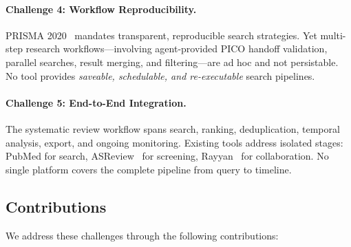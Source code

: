 \documentclass[11pt,a4paper]{article}
\begin{document}
\paragraph{Challenge 4: Workflow Reproducibility.}
PRISMA 2020~\citep{page2021prisma} mandates transparent, reproducible search strategies.
Yet multi-step research workflows---involving agent-provided PICO handoff validation, parallel searches, result merging, and filtering---are ad hoc and not persistable.
No tool provides \emph{saveable, schedulable, and re-executable} search pipelines.

\paragraph{Challenge 5: End-to-End Integration.}
The systematic review workflow spans search, ranking, deduplication, temporal analysis, export, and ongoing monitoring.
Existing tools address isolated stages: PubMed for search, ASReview~\citep{van2021asreview} for screening, Rayyan~\citep{ouzzani2016rayyan} for collaboration.
No single platform covers the complete pipeline from query to timeline.

\subsection{Contributions}

We address these challenges through the following contributions:
\end{document}
